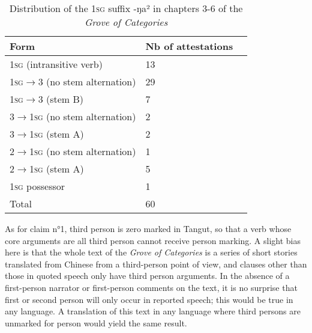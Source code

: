 \documentclass[oldfontcommands,oneside,a4paper,11pt]{article}
\newcommand{\ipa}[1]{{\phon \mbox{#1}}} %
\newcommand{\zh}[1]{{\cn #1}}
\newcommand{\tgf}[1]{\begin{tabular}{l}\mo{#1}\\{\tiny #1}\end{tabular}}
\begin{document}
\begin{table}[H]
\caption{Distribution of the \textsc{1sg} suffix \ipa{-ŋa²} in chapters 3-6 of the \textit{Grove of Categories}} \label{tab:1sg} \centering
\begin{tabular}{lll}
\toprule
Form& Nb of attestations \\
\midrule
\textsc{1sg} (intransitive verb) & 	13 \\ 
\textsc{1sg}$\rightarrow$3  (no stem alternation) & 	29 \\ 
\textsc{1sg}$\rightarrow$3 (stem B)& 	7 \\ 
3$\rightarrow$\textsc{1sg} (no stem alternation) & 	2 \\ 
3$\rightarrow$\textsc{1sg} (stem A)& 	2 \\ 
2$\rightarrow$\textsc{1sg} (no stem alternation)& 	1 \\ 
2$\rightarrow$\textsc{1sg}  (stem A)& 	5 \\ 
\textsc{1sg} possessor & 	1 \\ 
\midrule
Total & 	60 \\ 
\bottomrule
\end{tabular}
\end{table}


As for claim n°1, third person is zero marked in Tangut, so that a verb whose core arguments are all third person cannot receive person marking. A slight bias here is that the whole text of the \textit{Grove of Categories} is a series of short stories translated from Chinese from a third-person point of view, and clauses other than those in quoted speech only have third person arguments. In the absence of a first-person narrator or first-person comments on the text, it is no surprise that first or second person will only occur in reported speech; this would be true in any language.  A translation of this text in any language where third persons are unmarked for person would yield the same result.

 


\end{document}
